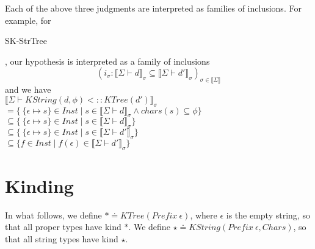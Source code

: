 \documentclass{article}
\newcommand{\sem}[1]{\llbracket #1 \rrbracket}
\begin{document}
Each of the above three judgments are interpreted as families of inclusions. For example, for \begin{sc}SK-StrTree\end{sc}, our hypothesis is interpreted as a family of inclusions $$(i_\sigma : \sem{\Sigma \vdash d}_{\sigma} \subseteq \sem{\Sigma \vdash d'}_\sigma)_{\sigma \in \sem{\Sigma}}$$ and we have\\
$\sem{\Sigma \vdash \mathit{KString(d,\phi)} <:: \mathit{KTree}(d')}_\sigma$\\
$= \{~\{ \epsilon \mapsto s \} \in \mathit{Inst} \mid s \in \sem{\Sigma \vdash d}_{\sigma} \wedge \mathit{chars}(s) \subseteq \phi \}$\\
$\subseteq \{~\{ \epsilon \mapsto s \} \in \mathit{Inst} \mid s \in \sem{\Sigma \vdash d}_{\sigma} \}$\\
$\subseteq \{~\{ \epsilon \mapsto s \} \in \mathit{Inst} \mid s \in \sem{\Sigma \vdash d'}_{\sigma} \}$\\
$\subseteq \{ f \in \mathit{Inst} \mid f(\epsilon) \in \sem{\Sigma \vdash d'}_{\sigma} \}$



\section*{Kinding}

In what follows, we define $\ast \doteq \mathit{KTree}(\mathit{Prefix}~\epsilon)$, where $\epsilon$ is the empty string, so that all proper types have kind $\ast$. We define $\star \doteq \mathit{KString}(\mathit{Prefix}~\epsilon, \mathit{Chars})$, so that all string types have kind $\star$.
\end{document}
